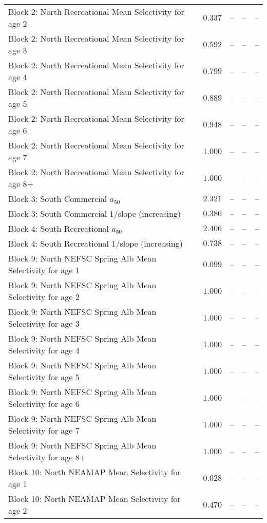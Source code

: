 \documentclass[
]{article}
\begin{document}
\begin{landscape}
\begin{longtable}[t]{lrrrr}
\addlinespace
Block 2: North Recreational Mean Selectivity for age 2 & $0.337$ & -- & -- & --\\
Block 2: North Recreational Mean Selectivity for age 3 & $0.592$ & -- & -- & --\\
Block 2: North Recreational Mean Selectivity for age 4 & $0.799$ & -- & -- & --\\
Block 2: North Recreational Mean Selectivity for age 5 & $0.889$ & -- & -- & --\\
Block 2: North Recreational Mean Selectivity for age 6 & $0.948$ & -- & -- & --\\
\addlinespace
Block 2: North Recreational Mean Selectivity for age 7 & $1.000$ & -- & -- & --\\
Block 2: North Recreational Mean Selectivity for age 8+ & $1.000$ & -- & -- & --\\
Block 3: South Commercial $a_{50}$ & $2.321$ & -- & -- & --\\
Block 3: South Commercial 1/slope (increasing) & $0.386$ & -- & -- & --\\
Block 4: South Recreational $a_{50}$ & $2.406$ & -- & -- & --\\
\addlinespace
Block 4: South Recreational 1/slope (increasing) & $0.738$ & -- & -- & --\\
Block 9: North NEFSC Spring Alb Mean Selectivity for age 1 & $0.099$ & -- & -- & --\\
Block 9: North NEFSC Spring Alb Mean Selectivity for age 2 & $1.000$ & -- & -- & --\\
Block 9: North NEFSC Spring Alb Mean Selectivity for age 3 & $1.000$ & -- & -- & --\\
Block 9: North NEFSC Spring Alb Mean Selectivity for age 4 & $1.000$ & -- & -- & --\\
\addlinespace
Block 9: North NEFSC Spring Alb Mean Selectivity for age 5 & $1.000$ & -- & -- & --\\
Block 9: North NEFSC Spring Alb Mean Selectivity for age 6 & $1.000$ & -- & -- & --\\
Block 9: North NEFSC Spring Alb Mean Selectivity for age 7 & $1.000$ & -- & -- & --\\
Block 9: North NEFSC Spring Alb Mean Selectivity for age 8+ & $1.000$ & -- & -- & --\\
Block 10: North NEAMAP Mean Selectivity for age 1 & $0.028$ & -- & -- & --\\
\addlinespace
Block 10: North NEAMAP Mean Selectivity for age 2 & $0.470$ & -- & -- & --\\

\end{longtable}
\end{landscape}
\end{document}
